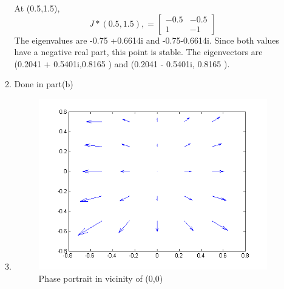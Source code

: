 \documentclass[a4paper]{article}
\begin{document}
\begin{enumerate}
\begin{enumerate}
	 At (0.5,1.5), 
	 \[J*(0.5,1.5),= \begin{bmatrix}
	 -0.5 &-0.5\\ 1 &-1
	 \end{bmatrix}\]
	 The eigenvalues are -0.75 +0.6614i and -0.75-0.6614i. Since both values have a negative real part, this point is stable.
	 The eigenvectors are (0.2041 + 0.5401i,0.8165 ) and (0.2041 - 0.5401i, 0.8165 ).	
	 \item Done in part(b)
	 \item 
	 
	 
	 
	    \begin{figure}[H]
	    	\centering
	    	\includegraphics[width=12cm]{zerozero}
	    	\caption{Phase portrait in vicinity of (0,0) }
	   

\end{figure}
\end{enumerate}
\end{enumerate}
\end{document}
